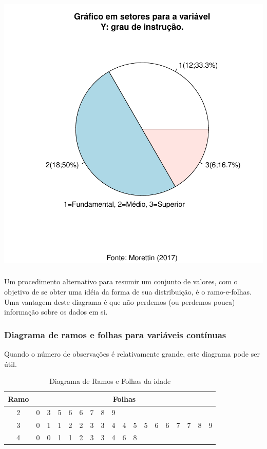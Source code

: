 \documentclass[14pt,aspectratio=1610]{beamer}
\begin{document}
\begin{frame}{}
\frametitle{}
\begin{block}{}
\begin{center}
\includegraphics{Aula4-pie2}
\end{center}
\end{block}
\end{frame}

\begin{frame}{}
\frametitle{}
\begin{block}{}
\justifying
Um procedimento alternativo para resumir um conjunto de valores, com o objetivo de se
obter uma idéia da forma de sua distribuição, é o ramo-e-folhas. Uma vantagem deste diagrama é que não perdemos (ou perdemos pouca) informação sobre os dados em si.
\end{block}
\end{frame}

\begin{frame}{}
\frametitle{Diagrama de ramos e folhas para variáveis contínuas}
\begin{block}{}
\justifying
Quando o número de observações é relativamente grande, este diagrama pode ser útil.
\begin{table}[H]
\caption{Diagrama de Ramos e Folhas da idade}
\begin{tabular}{c|ccccccccccccccccc}
Ramo&\multicolumn{17}{c}{Folhas}\\
\hline
2&0&3&5&6&6&7&8&9& & & & & & & & & \\
3&0&1&1&2&2&3&3&4&4&5&5&6&6&7&7&8&9\\
4&0&0&1&1&2&3&3&4&6&8& & & & & & & 
\end{tabular}
\end{table}
\end{block}
\end{frame}
\end{document}
